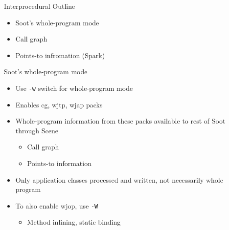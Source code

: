 \begin{slide}{Interprocedural Outline}
\begin{itemize}
\item Soot's whole-program mode
\item Call graph
\item Points-to infromation (Spark)
\end{itemize}
\end{slide}

\begin{slide}{Soot's whole-program mode}
\begin{itemize}
\item Use \texttt{-w} switch for whole-program mode
\item Enables cg, wjtp, wjap packs
\item Whole-program information from these packs available to rest of Soot through Scene
\begin{itemize}
\item Call graph
\item Points-to information
\end{itemize}
\item Only application classes processed and written, not necessarily whole program
\item To also enable wjop, use \texttt{-W}
\begin{itemize}
\item Method inlining, static binding
\end{itemize}
\end{itemize}
\end{slide}





